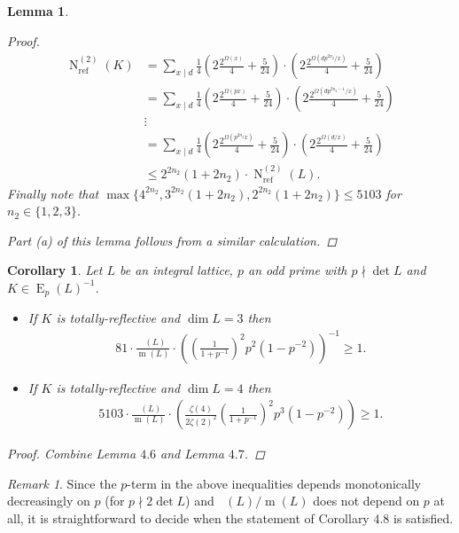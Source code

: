 \documentclass{amsart}
\newtheorem{cor}[thm]{Corollary}
\newtheorem{lem}[thm]{Lemma}
\theoremstyle{definition}
\theoremstyle{remark}
\newtheorem{rem}[thm]{Remark}
\DeclareMathOperator{\m}{m}
\DeclareMathOperator{\N}{N}
\DeclareMathOperator{\Nref}{N_{ref}}
\DeclareMathOperator{\E}{E}
\begin{document}
\begin{lem}
\begin{proof}
\begin{align*}
  \N^{(2)}_{\mathrm{ref}}(K) &= \sum_{x \mid d} \frac{1}{4} \left( 2\frac{2^{\Omega(x)}}{4} + \frac{5}{24} \right)\cdot \left( 2\frac{2^{\Omega(dp^{2n_2}/x)}}{4} + \frac{5}{24} \right)\\ 
                                         &= \sum_{x \mid d} \frac{1}{4} \left( 2\frac{2^{\Omega(px)}}{4} + \frac{5}{24} \right)\cdot \left( 2\frac{2^{\Omega(dp^{2n_2-1}/x)}}{4} + \frac{5}{24} \right) \\
                                         & \vdots \\
                                         &= \sum_{x \mid d} \frac{1}{4} \left( 2\frac{2^{\Omega(p^{2n_2}x)}}{4} + \frac{5}{24} \right)\cdot \left( 2\frac{2^{\Omega(d/x)}}{4} + \frac{5}{24} \right)\\
                                         &\leq 2^{2n_2}(1+2n_2) \cdot \N^{(2)}_{\mathrm{ref}}(L).
 \end{align*}
 Finally note that $\max\{4^{2n_2}, 3^{2n_2} (1+2n_2), 2^{2n_2}(1+2n_2) \} \leq 5103$ for $n_2 \in \{1,2,3\}$.

 Part (a) of this lemma follows from a similar calculation.
 \end{proof}
\end{lem}

\begin{cor}
 Let $L$ be an integral lattice, $p$ an odd prime with $p \nmid \det L$ and $K \in \E_p(L)^{-1}$.
 \begin{itemize}
  \item[(a)] If $K$ is totally-reflective and $\dim L =3$ then 
             \begin{align*}
              81 \cdot \frac{\Nref(L)}{\m(L)} \cdot \left(\left(\frac{1}{1+p^{-1}}\right)^2 p^2 \left(1-p^{-2}\right)\right)^{-1} \geq 1.
             \end{align*}
  \item[(b)] If $K$ is totally-reflective and $\dim L =4$ then 
             \begin{align*}
              5103 \cdot \frac{\Nref(L)}{\m(L)} \cdot \left( \frac{\zeta(4)}{2\zeta(2)^2} \left(\frac{1}{1+p^{-1}}\right)^2 p^3 \left(1-p^{-2}\right)\right)\geq 1.
             \end{align*}
 \end{itemize}
 \begin{proof}
  Combine Lemma $4.6$ and Lemma $4.7$.
 \end{proof}
\end{cor}

\begin{rem}
Since the $p$-term in the above inequalities depends monotonically decreasingly on $p$ (for $p \nmid 2\det L$) and $\Nref(L)/{\m(L)}$ does not depend on $p$ at all, 
it is straightforward to decide when the statement of Corollary $4.8$ is satisfied.
\end{rem}
\end{document}
